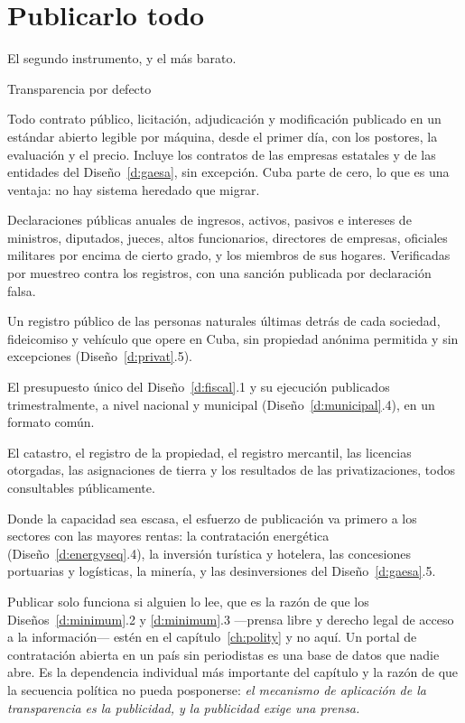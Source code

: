 \section{Publicarlo todo}

El segundo instrumento, y el más barato.

\begin{design}{Transparencia por defecto}
\label{d:transparency}
\begin{rules}
 Todo contrato público, licitación, adjudicación y modificación
publicado en un estándar abierto legible por máquina, desde el primer día, con los postores, la
evaluación y el precio. Incluye los contratos de las empresas estatales y de las entidades del
Diseño~\ref{d:gaesa}, sin excepción. Cuba parte de cero, lo que es una ventaja: no hay sistema
heredado que migrar.

 Declaraciones públicas anuales de ingresos, activos, pasivos e
intereses de ministros, diputados, jueces, altos funcionarios, directores de empresas, oficiales
militares por encima de cierto grado, y los miembros de sus hogares. Verificadas por muestreo
contra los registros, con una sanción publicada por declaración falsa.

 Un registro público de las personas naturales últimas detrás
de cada sociedad, fideicomiso y vehículo que opere en Cuba, sin propiedad anónima permitida y sin
excepciones (Diseño~\ref{d:privat}.5).

 El presupuesto único del Diseño~\ref{d:fiscal}.1 y su ejecución
publicados trimestralmente, a nivel nacional y municipal (Diseño~\ref{d:municipal}.4), en un
formato común.

 El catastro, el registro de la propiedad, el registro mercantil, las
licencias otorgadas, las asignaciones de tierra y los resultados de las privatizaciones, todos
consultables públicamente.

 Donde la capacidad sea escasa, el esfuerzo de publicación va
primero a los sectores con las mayores rentas: la contratación energética
(Diseño~\ref{d:energyseq}.4), la inversión turística y hotelera, las concesiones portuarias y
logísticas, la minería, y las desinversiones del Diseño~\ref{d:gaesa}.5.
\end{rules}
\end{design}

Publicar solo funciona si alguien lo lee, que es la razón de que los Diseños~\ref{d:minimum}.2 y
\ref{d:minimum}.3 ---prensa libre y derecho legal de acceso a la información--- estén en el
capítulo~\ref{ch:polity} y no aquí. Un portal de contratación abierta en un país sin periodistas
es una base de datos que nadie abre. Es la dependencia individual más importante del capítulo y
la razón de que la secuencia política no pueda posponerse: \emph{el mecanismo de aplicación de la
transparencia es la publicidad, y la publicidad exige una prensa.}

